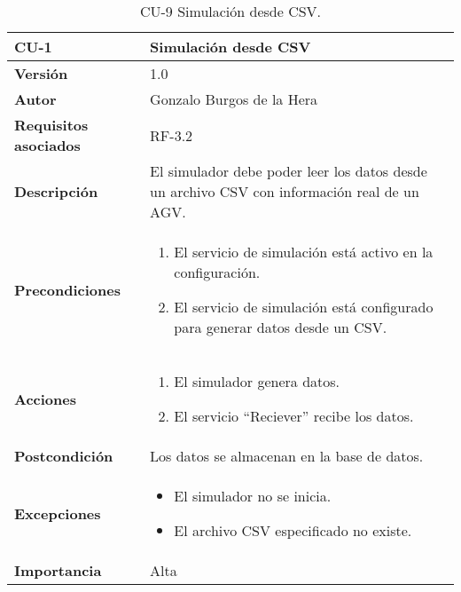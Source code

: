 \begin{table}[H]
	\centering
	\begin{tabularx}{\linewidth}{ p{} p{} }
		\toprule
		\textbf{CU-1}    & \textbf{Simulación desde CSV}\\
		\toprule
		\textbf{Versión}              & 1.0    \\
		\textbf{Autor}                & Gonzalo Burgos de la Hera \\
		\textbf{Requisitos asociados} & RF-3.2 \\
		\textbf{Descripción}          & El simulador debe poder leer los datos desde un archivo CSV con información real de un AGV. \\
		\textbf{Precondiciones}       & 
        \begin{enumerate}
			\def\labelenumi{\arabic{enumi}.}
			\tightlist
			\item El servicio de simulación está activo en la configuración.
			\item El servicio de simulación está configurado para generar datos desde un CSV.
		\end{enumerate}\\
		\textbf{Acciones}             &
		\begin{enumerate}
			\def\labelenumi{\arabic{enumi}.}
			\tightlist
			\item El simulador genera datos.
			\item El servicio ``Reciever'' recibe los datos.
		\end{enumerate}\\
		\textbf{Postcondición}        & Los datos se almacenan en la base de datos. \\
		\textbf{Excepciones}          & 
        \begin{itemize}
			\tightlist
			\item El simulador no se inicia.
			\item El archivo CSV especificado no existe.
        \end{itemize} \\
		\textbf{Importancia}          & Alta \\
		\bottomrule
	\end{tabularx}
	\caption{CU-9 Simulación desde CSV.}
\end{table}

